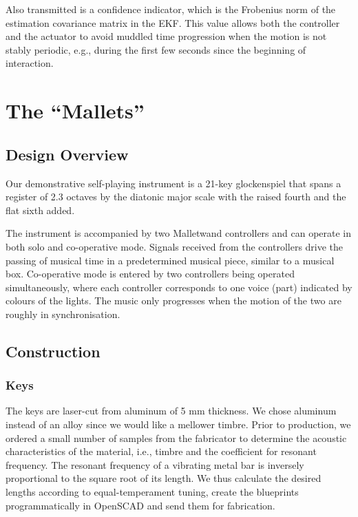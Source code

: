 \documentclass{nime-alternate} %
\begin{document}
Also transmitted is a confidence indicator, which is the Frobenius norm of the estimation covariance matrix in the EKF. This value allows both the controller and the actuator to avoid muddled time progression when the motion is not stably periodic, e.g., during the first few seconds since the beginning of interaction.

\section{The ``Mallets''}

\subsection{Design Overview}
Our demonstrative self-playing instrument is a 21-key glockenspiel that spans a register of 2.3 octaves by the diatonic major scale with the raised fourth and the flat sixth added.

The instrument is accompanied by two Malletwand controllers and can operate in both solo and co-operative mode. Signals received from the controllers drive the passing of musical time in a predetermined musical piece, similar to a musical box. Co-operative mode is entered by two controllers being operated simultaneously, where each controller corresponds to one voice (part) indicated by colours of the lights. The music only progresses when the motion of the two are roughly in synchronisation.

\subsection{Construction}
\subsubsection{Keys}
The keys are laser-cut from aluminum of 5 mm thickness. We chose aluminum instead of an alloy since we would like a mellower timbre. Prior to production, we ordered a small number of samples from the fabricator to determine the acoustic characteristics of the material, i.e., timbre and the coefficient for resonant frequency. The resonant frequency of a vibrating metal bar is inversely proportional to the square root of its length. We thus calculate the desired lengths according to equal-temperament tuning, create the blueprints programmatically in OpenSCAD and send them for fabrication.
\end{document}

